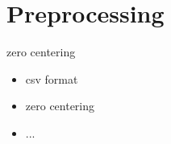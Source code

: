 \section{Preprocessing}
\label{sec:preprocessing}
zero centering
\begin{itemize}
	\item csv format
	\item zero centering
	\item ...
\end{itemize}